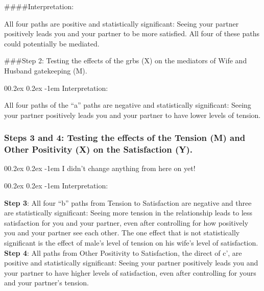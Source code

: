 \documentclass[
  english,
  man,floatsintext]{apa6}
\makeatletter
\let\oldparagraph\paragraph
\renewcommand{\paragraph}[1]{\oldparagraph{#1}\mbox{}}
\renewcommand{\paragraph}{\@startsection{paragraph}{4}{\parindent}%
  {0\baselineskip \@plus 0.2ex \@minus 0.2ex}%
  {-1em}%
  {\normalfont\normalsize\bfseries\itshape\typesectitle}}
\makeatother
\begin{document}
\#\#\#\#Interpretation:

All four paths are positive and statistically significant: Seeing your partner positively leads you and your partner to be more satisfied. All four of these paths could potentially be mediated.

\#\#\#Step 2: Testing the effects of the grbs (X) on the mediators of Wife and Husband gatekeeping (M).

\hypertarget{interpretation}{%
\paragraph{Interpretation:}\label{interpretation}}

All four paths of the \enquote{a} paths are negative and statistically significant: Seeing your partner positively leads you and your partner to have lower levels of tension.

\hypertarget{steps-3-and-4-testing-the-effects-of-the-tension-m-and-other-positivity-x-on-the-satisfaction-y.}{%
\subsubsection{Steps 3 and 4: Testing the effects of the Tension (M) and Other Positivity (X) on the Satisfaction (Y).}\label{steps-3-and-4-testing-the-effects-of-the-tension-m-and-other-positivity-x-on-the-satisfaction-y.}}

\hypertarget{i-didnt-change-anything-from-here-on-yet}{%
\paragraph{I didn't change anything from here on yet!}\label{i-didnt-change-anything-from-here-on-yet}}

\hypertarget{interpretation-1}{%
\paragraph{Interpretation:}\label{interpretation-1}}

\textbf{Step 3}: All four \enquote{b} paths from Tension to Satisfaction are negative and three are statistically significant: Seeing more tension in the relationship leads to less satisfaction for you and your partner, even after controlling for how positively you and your partner see each other. The one effect that is not statistically significant is the effect of male's level of tension on his wife's level of satisfaction.\\
\textbf{Step 4}: All paths from Other Positivity to Satisfaction, the direct of c', are positive and statistically significant: Seeing your partner positively leads you and your partner to have higher levels of satisfaction, even after controlling for yours and your partner's tension.
\end{document}
